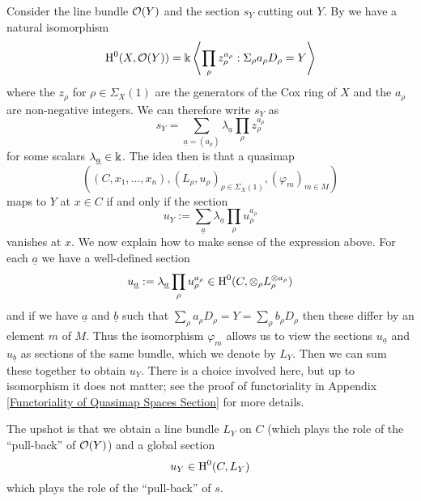 Consider the line bundle $\mathcal{O}(Y)$ and the section $s_Y$ cutting out $Y$. By \cite{CoxRing} we have a natural isomorphism
\begin{equation*} \operatorname{H}^0(X,\mathcal{O}(Y)) = \Bbbk \left\langle \prod_{\rho} z_\rho^{a_\rho} : \Sigma_\rho a_\rho D_\rho = Y \right\rangle \end{equation*}
where the $z_\rho$ for $\rho \in \Sigma_X(1)$ are the generators of the Cox ring of $X$ and the $a_\rho$ are non-negative integers. We can therefore write $s_Y$ as
\begin{equation*} s_Y = \sum_{\underline{a}=(a_\rho)} \lambda_{\underline{a}} \prod_\rho z_\rho^{a_\rho} \end{equation*}
for some scalars $\lambda_{\underline{a}} \in \Bbbk$. The idea then is that a quasimap
\begin{equation*} ((C,x_1,\ldots,x_n), (L_\rho,u_\rho)_{\rho \in \Sigma_X(1)}, (\varphi_m)_{m \in M}) \end{equation*}
maps to $Y$ at $x \in C$ if and only if the section
\begin{equation*} u_Y := \sum_{\underline{a}} \lambda_{\underline{a}} \prod_\rho u_\rho^{a_\rho} \end{equation*}
vanishes at $x$. We now explain how to make sense of the expression above. For each $\underline{a}$ we have a well-defined section
\begin{equation*} u_{\underline{a}} := \lambda_{\underline{a}} \prod_\rho u_\rho^{a_\rho} \in \operatorname{H}^0(C,\otimes_\rho L_\rho^{\otimes a_\rho}) \end{equation*}
and if we have $\underline{a}$ and $\underline{b}$ such that $\sum_\rho a_\rho D_\rho = Y = \sum_\rho b_\rho D_\rho$ then these differ by an element $m$ of $M$. Thus the isomorphism $\varphi_m$ allows us to view the sections $u_{\underline{a}}$ and $u_{\underline{b}}$ as sections of the same bundle, which we denote by $L_Y$. Then we can sum these together to obtain $u_Y$. There is a choice involved here, but up to isomorphism it does not matter; see the proof of functoriality in Appendix \ref{Functoriality of Quasimap Spaces Section} for more details.

The upshot is that we obtain a line bundle $L_Y$ on $C$ (which plays the role of the ``pull-back'' of $\mathcal{O}(Y)$) and a global section
\begin{equation*} u_Y \in \operatorname{H}^0(C,L_Y) \end{equation*}
which plays the role of the ``pull-back'' of $s$.

